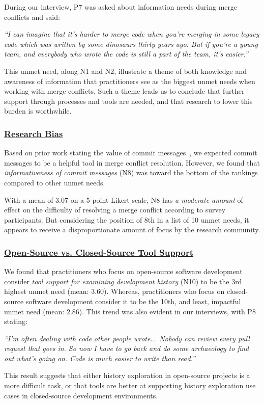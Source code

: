 During our interview, P7 was asked about information needs during merge conflicts and said:
\begin{displayquote}
\textit{``I can imagine that it's harder to merge code when you're merging in some legacy code which was written by some dinosaurs thirty years ago. But if you're a young team, and everybody who wrote the code is still a part of the team, it's easier.''}
\end{displayquote}

This unmet need, along N1 and N2, illustrate a theme of both knowledge and awareness of information that practitioners see as the biggest unmet needs when working with merge conflicts.
Such a theme leads us to conclude that further support through processes and tools are needed, and that research to lower this burden is worthwhile.

\subsubsection{\underline{Research Bias}}
Based on prior work stating the value of commit messages~\cite{yamauchi2014clustering}\cite{hindle2009automatic}\cite{cortes2014automatically}\cite{hattori2008nature}, we expected commit messages to be a helpful tool in merge conflict resolution.
However, we found that \textit{informativeness of commit messages} (N8) was toward the bottom of the rankings compared to other unmet needs.

With a mean of 3.07 on a 5-point Likert scale, N8 has \textit{a moderate amount} of effect on the difficulty of resolving a merge conflict according to survey participants.
But considering the position of 8th in a list of 10 unmet needs, it appears to receive a disproportionate amount of focus by the research community.



\subsubsection{\underline{Open-Source vs. Closed-Source Tool Support}}
\label{oss_vs_closed_tool_support}
We found that practitioners who focus on open-source software development consider \textit{tool support for examining development history} (N10) to be the 3rd highest unmet need (mean: 3.60).
Whereas, practitioners who focus on closed-source software development consider it to be the 10th, and least, impactful unmet need (mean: 2.86).
This trend was also evident in our interviews, with P8 stating:

\begin{displayquote}
\textit{``I'm often dealing with code other people wrote... Nobody can review every pull request that goes in. So now I have to go back and do some archaeology to find out what's going on. Code is much easier to write than read.''}
\end{displayquote}

This result suggests that either history exploration in open-source projects is a more difficult task, or that tools are better at supporting history exploration use cases in closed-source development environments.

